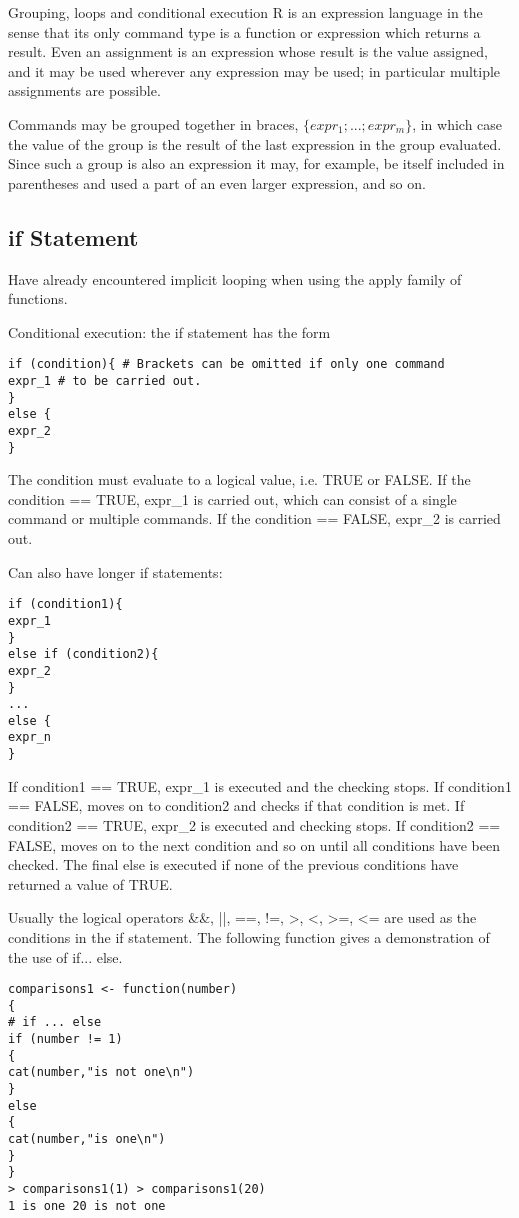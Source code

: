Grouping, loops and conditional execution
R is an expression language in the sense that its only command type is a function or expression which returns a result. Even an assignment is an expression whose result is the value assigned, and it may be used wherever any expression may be used; in particular multiple assignments are possible.

Commands may be grouped together in braces, $\{expr_1; ...; expr_m\}$, in which case the value of the group is the result of the last expression in the group evaluated. Since such a group is also an expression it may, for example, be itself included in parentheses and used a part of an even larger expression, and so on.  


\subsection*{if Statement}

Have already encountered implicit looping when using the apply
family of functions.

Conditional execution: the if statement has the form 
\begin{verbatim}
if (condition){ # Brackets can be omitted if only one command
expr_1 # to be carried out.
}
else {
expr_2
}    
\end{verbatim}


The condition must evaluate to a logical value, i.e. TRUE or
FALSE. If the condition == TRUE, expr\_1 is carried out, which
can consist of a single command or multiple commands. If the
condition == FALSE, expr\_2 is carried out.

Can also have longer if statements:
\begin{verbatim}
if (condition1){
expr_1
}
else if (condition2){
expr_2
}
...
else {
expr_n
}   
\end{verbatim}

If condition1 == TRUE, expr\_1 is executed and the checking
stops. If condition1 == FALSE, moves on to condition2 and
checks if that condition is met. If condition2 == TRUE, expr\_2
is executed and checking stops. If condition2 == FALSE, moves
on to the next condition and so on until all conditions have been
checked.
The final else is executed if none of the previous conditions have
returned a value of TRUE.


Usually the logical operators &&, ||, ==, !=, >, <, >=, <= are used
as the conditions in the if statement.
The following function gives a demonstration of the use of
if... else.
\begin{verbatim}
comparisons1 <- function(number)
{
# if ... else
if (number != 1)
{
cat(number,"is not one\n")
}
else
{
cat(number,"is one\n")
}
}
> comparisons1(1) > comparisons1(20)
1 is one 20 is not one
\end{verbatim}


